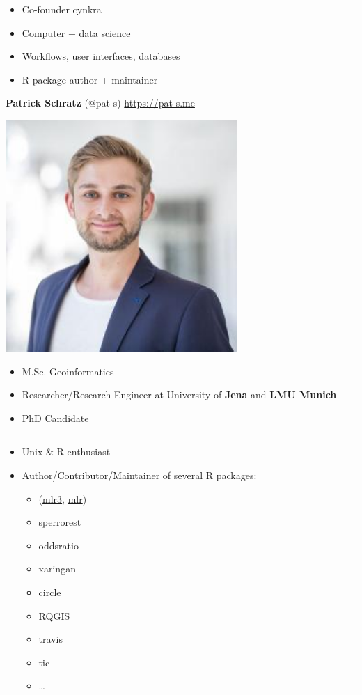 \documentclass[]{book}
\providecommand{\tightlist}{%
  \setlength{\itemsep}{0pt}\setlength{\parskip}{0pt}}
\begin{document}
\begin{itemize}
\tightlist
\item
  Co-founder cynkra
\item
  Computer + data science
\item
  Workflows, user interfaces, databases
\item
  R package author + maintainer
\end{itemize}

\textbf{Patrick Schratz} (@pat-s) \url{https://pat-s.me}

\begin{flushright}\includegraphics[width=3.47in]{img/pjs} \end{flushright}

\begin{itemize}
\tightlist
\item
  M.Sc. Geoinformatics
\item
  Researcher/Research Engineer at University of \textbf{Jena} and \textbf{LMU Munich}
\item
  PhD Candidate
\end{itemize}

\begin{center}\rule{0.5\linewidth}{\linethickness}\end{center}

\begin{itemize}
\tightlist
\item
  Unix \& R enthusiast
\item
  Author/Contributor/Maintainer of several R packages:

  \begin{itemize}
  \tightlist
  \item
    (\href{https://github.com/mlr-org/mlr3}{mlr3}, \href{https://github.com/mlr-org/mlr}{mlr})
  \item
    sperrorest
  \item
    oddsratio
  \item
    xaringan
  \item
    circle
  \item
    RQGIS
  \item
    travis
  \item
    tic
  \item
    \ldots{}
  \end{itemize}
\end{itemize}
\end{document}
